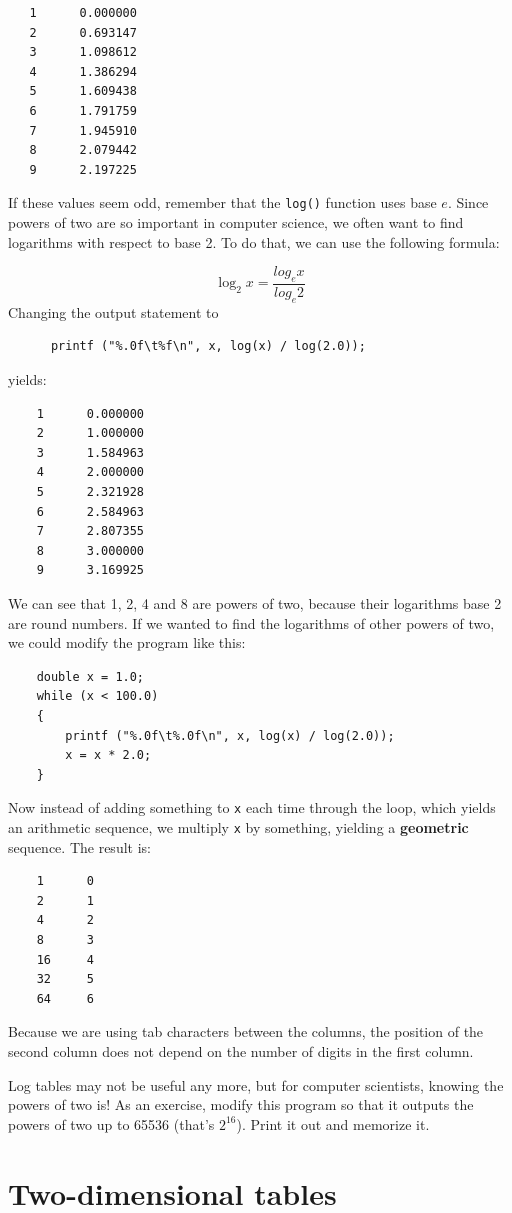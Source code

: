 \begin{verbatim}
   1      0.000000
   2      0.693147
   3      1.098612
   4      1.386294
   5      1.609438
   6      1.791759
   7      1.945910
   8      2.079442
   9      2.197225
\end{verbatim}
%
If these values seem odd, remember that the {\tt log()} function uses
base $e$.  Since powers of two are so important in computer science,
we often want to find logarithms with respect to base 2.  To do that,
we can use the following formula:

\[ \log_2 x = \frac {log_e x}{log_e 2} \]
%
Changing the output statement to

\begin{verbatim}
      printf ("%.0f\t%f\n", x, log(x) / log(2.0));
\end{verbatim}
%
yields:

\begin{verbatim}
    1      0.000000
    2      1.000000
    3      1.584963
    4      2.000000
    5      2.321928
    6      2.584963
    7      2.807355
    8      3.000000
    9      3.169925
\end{verbatim}
%
We can see that 1, 2, 4 and 8 are powers of two, because
their logarithms base 2 are round numbers.  If we wanted to find
the logarithms of other powers of two, we could modify the
program like this:

\begin{verbatim}
    double x = 1.0;
    while (x < 100.0) 
    {
        printf ("%.0f\t%.0f\n", x, log(x) / log(2.0));
        x = x * 2.0;
    }
\end{verbatim}
%
Now instead of adding something to {\tt x} each time through
the loop, which yields an arithmetic sequence, we multiply
{\tt x} by something, yielding a {\bf geometric} sequence.
The result is:

\begin{verbatim}
    1      0
    2      1
    4      2
    8      3
    16     4
    32     5
    64     6
\end{verbatim}
%
Because we are using tab characters between the columns, the
position of the second column does not depend on the number
of digits in the first column.

Log tables may not be useful any more, but for computer scientists,
knowing the powers of two is!  As an exercise, modify this program
so that it outputs the powers of two up to 65536
(that's $2^{16}$).  Print it out and memorize it.

\section{Two-dimensional tables}

